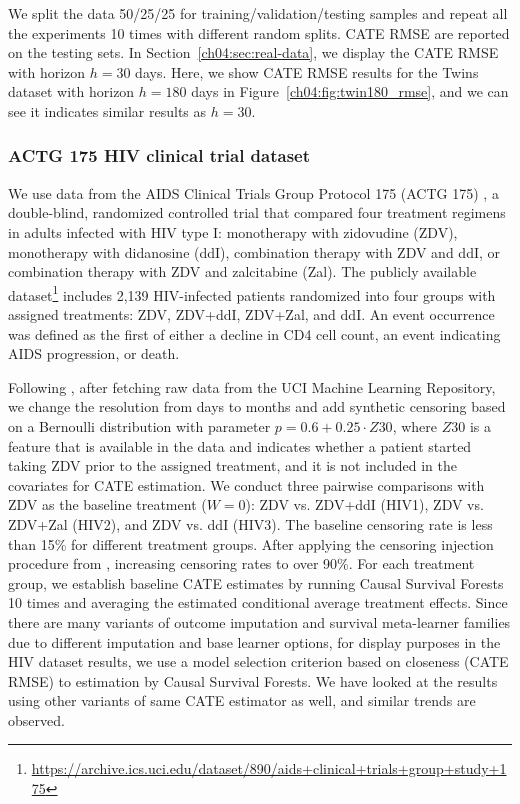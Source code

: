 We split the data 50/25/25 for training/validation/testing samples and repeat all the experiments 10 times with different random splits.
CATE RMSE are reported on the testing sets.
In Section~\ref{ch04:sec:real-data}, we display the CATE RMSE with horizon $h=30$ days.
Here, we show CATE RMSE results for the Twins dataset with horizon $h = 180$ days in Figure~\ref{ch04:fig:twin180_rmse}, and we can see it indicates similar results as $h=30$.







\subsubsection{ACTG 175 HIV clinical trial dataset} \label{ch04:subapp:hiv-data-additional-result}

We use data from the AIDS Clinical Trials Group Protocol 175 (ACTG 175) \citep{hammer1996atrial}, a double-blind, randomized controlled trial that compared four treatment regimens in adults infected with HIV type I: monotherapy with zidovudine (ZDV), monotherapy with didanosine (ddI), combination therapy with ZDV and ddI, or combination therapy with ZDV and zalcitabine (Zal).
The publicly available dataset\footnote{\url{https://archive.ics.uci.edu/dataset/890/aids+clinical+trials+group+study+175}} includes 2,139 HIV-infected patients randomized into four groups with assigned treatments: ZDV, ZDV+ddI, ZDV+Zal, and ddI.
An event occurrence was defined as the first of either a decline in CD4 cell count, an event indicating AIDS progression, or death. 

Following \citet{meir2025heterogeneous}, after fetching raw data from the UCI Machine Learning Repository, we change the resolution from days to months and add synthetic censoring based on a Bernoulli distribution with parameter $p=0.6+0.25 \cdot Z30$, where $Z30$ is a feature that is available in the data and indicates whether a patient started taking ZDV prior to the assigned treatment, and it is not included in the covariates for CATE estimation. 
We conduct three pairwise comparisons with ZDV as the baseline treatment ($W=0$): ZDV vs. ZDV+ddI (HIV1), ZDV vs. ZDV+Zal (HIV2), and ZDV vs. ddI (HIV3).
The baseline censoring rate is less than 15\% for different treatment groups.
After applying the censoring injection procedure from \citet{meir2025heterogeneous}, increasing censoring rates to over 90\%.
For each treatment group, we establish baseline CATE estimates by running Causal Survival Forests 10 times and averaging the estimated conditional average treatment effects.
Since there are many variants of outcome imputation and survival meta-learner families due to different imputation and base learner options, for display purposes in the HIV dataset results, we use a model selection criterion based on closeness (CATE RMSE) to estimation by Causal Survival Forests.
We have looked at the results using other variants of same CATE estimator as well, and similar trends are observed.

